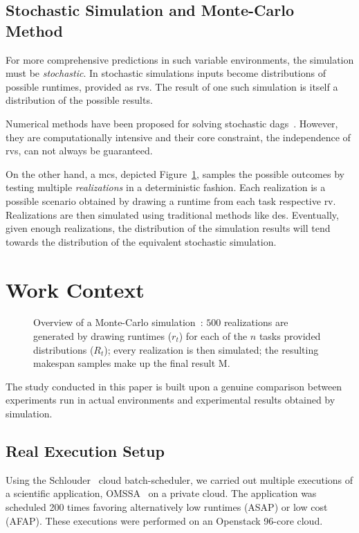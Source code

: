 \documentclass[10pt,conference,compsocconf]{IEEEtran}
\begin{document}
\subsection{Stochastic Simulation and Monte-Carlo Method}

\label{sc:relwork-stochastic}
For  more   comprehensive  predictions  in  such   variable  environments,  the
simulation must  be \emph{stochastic}.  In stochastic simulations  inputs become
distributions of possible runtimes, provided as \acp{rv}.
The  result  of one  such  simulation  is  itself  a distribution of the
possible results.

Numerical methods have been proposed for solving stochastic
\acp{dag}~\cite{Li97,Ludwig01}. However, they are computationally intensive and
their core constraint, the independence of \acp{rv}, can not always be
guaranteed. 

On the other hand, a \ac{mcs}, depicted
Figure~\ref{fig:mc-process}, samples the possible outcomes by testing  multiple
\emph{realizations} in a deterministic fashion.  Each realization is a possible
scenario obtained by drawing a runtime from each task respective \ac{rv}.
Realizations are then simulated using traditional methods like \ac{des}.
Eventually, given enough realizations, the distribution of the simulation
results will  tend towards the  distribution of the equivalent stochastic
simulation. 

\section{Work Context}
\label{sec:work-context}
\begin{figure}
	\centering
	\resizebox{0.9\linewidth}{!}{%
		
		}
\caption{Overview of a Monte-Carlo simulation~: $500$ realizations are generated
	by drawing runtimes ($r_t$) for each of the $n$ tasks provided
	distributions ($R_t$); every realization is then simulated; the 
	resulting makespan samples make up the final result M.}\label{fig:mc-process}
\end{figure}

The  study conducted  in this  paper  is built upon a genuine comparison  between
experiments  run in  actual environments  and experimental  results obtained  by
simulation.  

\subsection{Real Execution Setup}
Using the Schlouder~\cite{Michon17} cloud batch-scheduler, we carried out
multiple executions of a scientific application, OMSSA~\cite{Geer2004} on a
private cloud.
The application was scheduled 200 times favoring alternatively low runtimes (ASAP) or 
low cost (AFAP). These executions were performed on an Openstack 96-core cloud. 
\end{document}
